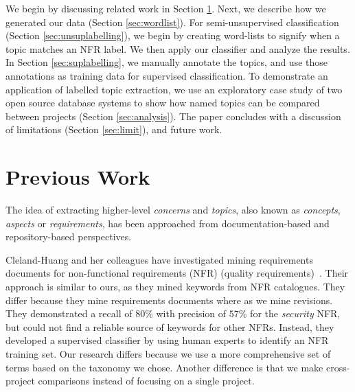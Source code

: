 \documentclass[smallextended]{svjour3}       %
\begin{document}
We begin by discussing related work in Section \ref{sec:related}.
Next, we describe how we generated our data (Section \ref{sec:wordlist}). For semi-unsupervised classification (Section \ref{sec:unsuplabelling}), we
begin by creating word-lists to signify when a topic matches an NFR label. We then apply our classifier and analyze the results. 
In Section \ref{sec:suplabelling}, we manually annotate the topics, and use those annotations as training data for supervised classification.  
To demonstrate an application of labelled topic extraction, we use an exploratory case study of two open source database systems to show how named
topics can be compared between projects  (Section \ref{sec:analysis}). 
The paper concludes with a discussion of limitations (Section \ref{sec:limit}), and future work.

\section{Previous Work}
\label{sec:related}

The idea of extracting higher-level \emph{concerns} and \emph{topics}, also known as
 \emph{concepts}, \emph{aspects} or \emph{requirements},
has been approached from documentation-based and repository-based
perspectives.

Cleland-Huang and her colleagues have investigated mining requirements documents for non-functional requirements (NFR) (quality
requirements)~\cite{Cleland-Huang2006}. 
Their approach is similar to ours, as they mined keywords from NFR
catalogues.
They differ because they mine requirements documents where as we mine revisions.
They demonstrated a recall of $80\%$ with precision of $57\%$ for the \emph{security} NFR, but could not find a reliable source of keywords for other NFRs. 
Instead, they developed a supervised classifier by using human experts to identify an NFR training set. 
Our research differs because we use a more comprehensive set of terms based on the taxonomy we chose.
Another difference is that we make cross-project comparisons instead of focusing
on a single project.
\end{document}
